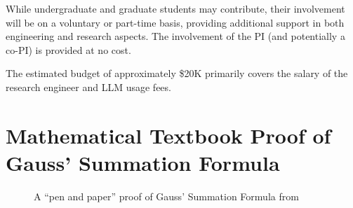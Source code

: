 \documentclass[10pt,nonacm,natbib=false]{acmart}
\begin{document}
While undergraduate and graduate students may contribute, their
involvement will be on a voluntary or part-time basis, providing
additional support in both engineering and research aspects. The
involvement of the PI (and potentially a co-PI) is provided at no
cost.

The estimated budget of approximately \$20K primarily covers the
salary of the research engineer and LLM usage fees.

\appendix

\newpage
\section{Mathematical Textbook Proof of Gauss' Summation Formula}

\label{sec:textbookproof}

\begin{figure}[h]
  \caption{A ``pen and paper'' proof of Gauss' Summation Formula from \cite{roberts2014introduction}}
\end{figure}
  
\end{document}
